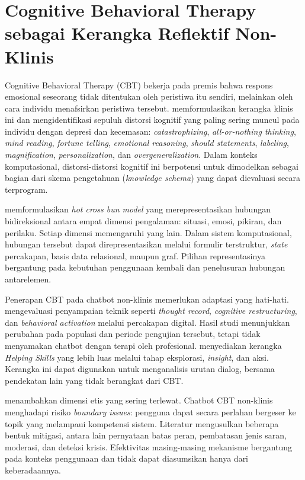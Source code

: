 \section{Cognitive Behavioral Therapy sebagai Kerangka Reflektif Non-Klinis}
\label{sec:cbt}

Cognitive Behavioral Therapy (CBT) bekerja pada premis bahwa respons emosional seseorang tidak ditentukan oleh peristiwa itu sendiri, melainkan oleh cara individu menafsirkan peristiwa tersebut. \textcite{beck1979} memformulasikan kerangka klinis ini dan mengidentifikasi sepuluh distorsi kognitif yang paling sering muncul pada individu dengan depresi dan kecemasan: \textit{catastrophizing}, \textit{all-or-nothing thinking}, \textit{mind reading}, \textit{fortune telling}, \textit{emotional reasoning}, \textit{should statements}, \textit{labeling}, \textit{magnification}, \textit{personalization}, dan \textit{overgeneralization}. Dalam konteks komputasional, distorsi-distorsi kognitif ini berpotensi untuk dimodelkan sebagai bagian dari skema pengetahuan (\textit{knowledge schema}) yang dapat dievaluasi secara terprogram.

\textcite{greenbergerPadesky1995} memformulasikan \textit{hot cross bun model} yang merepresentasikan hubungan bidireksional antara empat dimensi pengalaman: situasi, emosi, pikiran, dan perilaku. Setiap dimensi memengaruhi yang lain. Dalam sistem komputasional, hubungan tersebut dapat direpresentasikan melalui formulir terstruktur, \textit{state} percakapan, basis data relasional, maupun graf. Pilihan representasinya bergantung pada kebutuhan penggunaan kembali dan penelusuran hubungan antarelemen.

Penerapan CBT pada chatbot non-klinis memerlukan adaptasi yang hati-hati. \textcite{fitzpatrick2017} mengevaluasi penyampaian teknik seperti \textit{thought record}, \textit{cognitive restructuring}, dan \textit{behavioral activation} melalui percakapan digital. Hasil studi menunjukkan perubahan pada populasi dan periode pengujian tersebut, tetapi tidak menyamakan chatbot dengan terapi oleh profesional. \textcite{hill2014} menyediakan kerangka \textit{Helping Skills} yang lebih luas melalui tahap eksplorasi, \textit{insight}, dan aksi. Kerangka ini dapat digunakan untuk menganalisis urutan dialog, bersama pendekatan lain yang tidak berangkat dari CBT.

\textcite{boucher2021} menambahkan dimensi etis yang sering terlewat. Chatbot CBT non-klinis menghadapi risiko \textit{boundary issues}: pengguna dapat secara perlahan bergeser ke topik yang melampaui kompetensi sistem. Literatur mengusulkan beberapa bentuk mitigasi, antara lain pernyataan batas peran, pembatasan jenis saran, moderasi, dan deteksi krisis. Efektivitas masing-masing mekanisme bergantung pada konteks penggunaan dan tidak dapat diasumsikan hanya dari keberadaannya.

